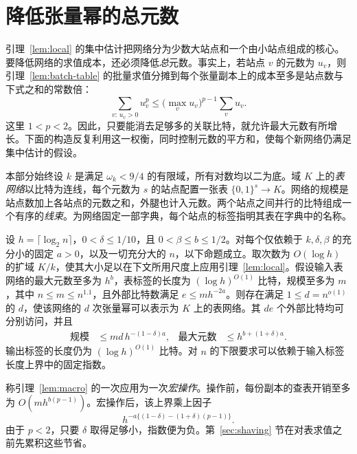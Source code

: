 \section{降低张量幂的总元数}\label{sec:rounds}

引理~\ref{lem:local} 的集中估计把网络分为少数大站点和一个由小站点组成的核心。要降低网络的求值成本，还必须降低\emph{总}元数。事实上，若站点 $v$ 的元数为 $u_v$，则引理~\ref{lem:batch-table} 的批量求值分摊到每个张量副本上的成本至多是站点数与下式之和的常数倍：\[
       \sum_{v:\,u_v>0}u_v^p
           \le \bigl(\max_v u_v\bigr)^{p-1}\sum_v u_v .
\] 这里 $1<p<2$。因此，只要能消去足够多的关联比特，就允许最大元数有所增长。下面的构造反复利用这一权衡，同时控制元数的平方和，使每个新网络仍满足集中估计的假设。

本部分始终设 $k$ 是满足 $\omega_k<9/4$ 的有限域，所有对数均以二为底。域 $K$ 上的\emph{表网络}以比特为连线，每个元数为 $s$ 的站点配置一张表 $\{0,1\}^{s}\to K$。网络的规模是站点数加上各站点的元数之和，外腿也计入元数。两个站点之间并行的比特组成一个有序的\emph{线束}。为网络固定一部字典，每个站点的标签指明其表在字典中的名称。

 \begin{lemma}[张量幂的压缩]\label{lem:macro} 设 $h=\lceil\log_2 n\rceil$，$0<\delta\le 1/10$，且 $0<\beta\le b\le 1/2$。对每个仅依赖于 $k,\delta,\beta$ 的充分小的固定 $a>0$，以及一切充分大的 $n$，以下命题成立。取次数为 $O(\log h)$ 的扩域 $K/k$，使其大小足以在下文所用尺度上应用引理~\ref{lem:local}。假设输入表网络的最大元数至多为 $h^b$，表标签的长度为 $(\log h)^{O(1)}$ 比特，规模至多为 $m$，其中 $n\le m\le n^{1.1}$，且外部比特数满足 $e\le m h^{-2a}$。则存在满足 $1\le d=n^{o(1)}$ 的 $d$，使该网络的 $d$ 次张量幂可以表示为 $K$ 上的表网络。其 $de$ 个外部比特均可分别访问，并且 \[
 \begin{aligned}
 \text{规模}&\le md\,h^{-(1-\delta)a},&
 \text{最大元数}&\le h^{b+(1+\delta)a}.
 \end{aligned}
\] 输出标签的长度仍为 $(\log h)^{O(1)}$ 比特。对 $n$ 的下限要求可以依赖于输入标签长度上界中的固定指数。\end{lemma}

称引理~\ref{lem:macro} 的一次应用为一次\emph{宏操作}。操作前，每份副本的查表开销至多为 $O(mh^{b(p-1)})$。宏操作后，该上界乘上因子 \[
       h^{-a\{(1-\delta)-(1+\delta)(p-1)\}} .
\] 由于 $p<2$，只要 $\delta$ 取得足够小，指数便为负。第~\ref{sec:shaving} 节在对表求值之前先累积这些节省。

